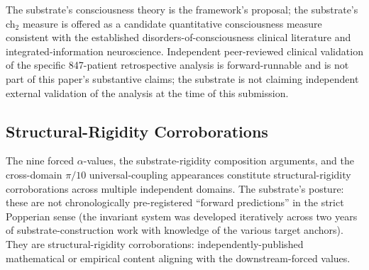 \documentclass[11pt,a4paper]{amsart}
\theoremstyle{plain}
\theoremstyle{definition}
\begin{document}
The substrate's consciousness theory is the framework's proposal; the substrate's ch${}_2$ measure is offered as a candidate quantitative consciousness measure consistent with the established disorders-of-consciousness clinical literature and integrated-information neuroscience. Independent peer-reviewed clinical validation of the specific 847-patient retrospective analysis is forward-runnable and is not part of this paper's substantive claims; the substrate is not claiming independent external validation of the analysis at the time of this submission.

\subsection{Structural-Rigidity Corroborations}\label{subsec:structural-rigidity}

The nine forced $\alpha$-values, the substrate-rigidity composition arguments, and the cross-domain $\pi/10$ universal-coupling appearances constitute structural-rigidity corroborations across multiple independent domains. The substrate's posture: these are not chronologically pre-registered ``forward predictions'' in the strict Popperian sense (the invariant system was developed iteratively across two years of substrate-construction work with knowledge of the various target anchors). They are structural-rigidity corroborations: independently-published mathematical or empirical content aligning with the downstream-forced values.
\end{document}
